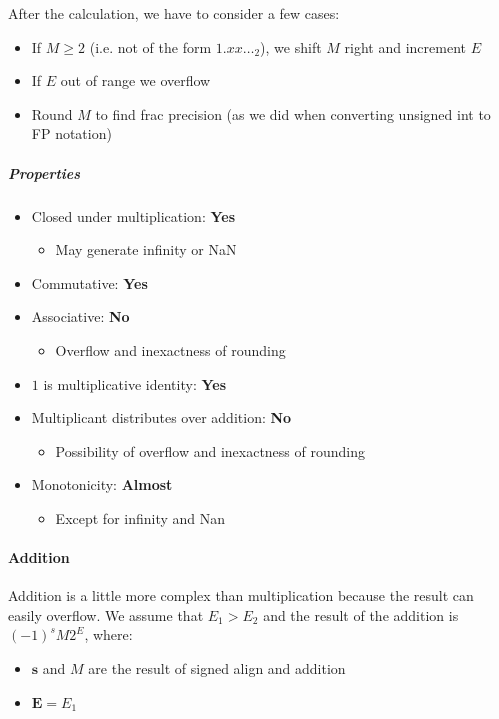 After the calculation, we have to consider a few cases:
\begin{itemize}
    \item If $M \ge 2$ (i.e. not of the form $1.xx\dots_2$), we shift $M$ right and increment $E$
    \item If $E$ out of range we overflow
    \item Round $M$ to find frac precision (as we did when converting unsigned int to FP notation)
\end{itemize}

\subparagraph{Properties}
\begin{itemize}
    \item Closed under multiplication: \textbf{Yes}
        \begin{itemize}
            \item May generate infinity or NaN
        \end{itemize}
    \item Commutative: \textbf{Yes}
    \item Associative: \textbf{No}
        \begin{itemize}
            \item Overflow and inexactness of rounding
        \end{itemize}
    \item $1$ is multiplicative identity: \textbf{Yes}
    \item Multiplicant distributes over addition: \textbf{No}
        \begin{itemize}
            \item Possibility of overflow and inexactness of rounding
        \end{itemize}
    \item Monotonicity: \textbf{Almost}
        \begin{itemize}
            \item Except for infinity and Nan
        \end{itemize}
\end{itemize}

\paragraph{Addition}
Addition is a little more complex than multiplication because the result can easily overflow. We assume that $E_1 > E_2$ and the result of the addition is $(-1)^s M 2^E$, where:
\begin{itemize}
    \item $\mathbf{s}$ and $\mathit{M}$ are the result of signed align and addition
    \item $\mathbf{E} = E_1$
\end{itemize}

